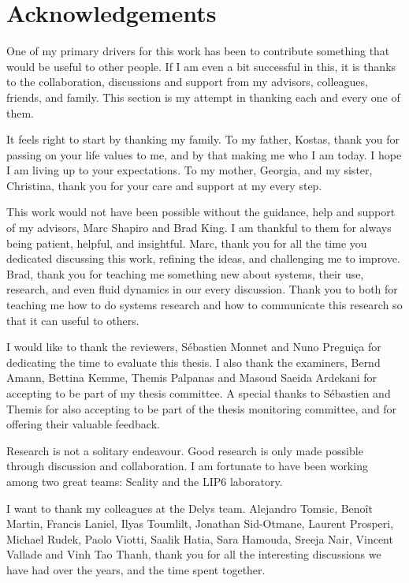 \chapter*{Acknowledgements}

\thispagestyle{empty}

One of my primary drivers for this work has been to contribute something that would be useful to other people.
If I am even a bit successful in this, it is thanks to the collaboration, discussions and support from my
advisors, colleagues, friends, and family.
This section is my attempt in thanking each and every one of them.

\small
It feels right to start by thanking my family. To my father, Kostas, thank you for passing on your life values to me,
and by that making me who I am today. I hope I am living up to your expectations.
To my mother, Georgia, and my sister, Christina, thank you for your care and support at my every step.

\bigskip
This work would not have been possible without the guidance, help and support of my advisors, Marc Shapiro and Brad King.
I am thankful to them for always being patient, helpful, and insightful.
Marc, thank you for all the time you dedicated discussing this work,
refining the ideas, and challenging me to improve.
Brad, thank you for teaching me something new about systems, their use, research, and even fluid dynamics in our every
discussion.
Thank you to both for teaching me how to do systems research and how to communicate this research so that it can useful
to others.

\bigskip
I would like to thank the reviewers, S{\'e}bastien Monnet and Nuno Pregui\c{c}a for dedicating the time
to evaluate this thesis.
I also thank the examiners, Bernd Amann, Bettina Kemme, Themis Palpanas and Masoud Saeida Ardekani for accepting to be
part of my thesis committee.
A special thanks to S{\'e}bastien and Themis for also accepting to be part of the thesis monitoring committee,
and for offering their valuable feedback.

\bigskip
Research is not a solitary endeavour.
Good research is only made possible through discussion and collaboration.
I am fortunate to have been working among two great teams: Scality and the LIP6 laboratory.

I want to thank my colleagues at the Delys team.
Alejandro Tomsic, Beno\^it Martin, Francis Laniel, Ilyas Toumlilt, Jonathan Sid-Otmane, Laurent Prosperi, Michael Rudek, Paolo Viotti, Saalik Hatia, Sara Hamouda, Sreeja Nair, Vincent Vallade and Vinh Tao Thanh, thank you
for all the interesting discussions we have had over the years, and the time spent together.

